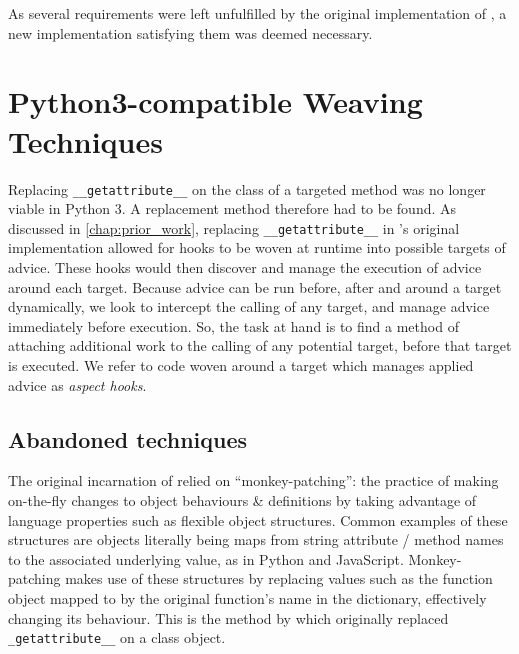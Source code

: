 As several requirements were left unfulfilled by the original
implementation of \pdsf{}, a new implementation satisfying them was deemed
necessary.


\section{Python3-compatible Weaving Techniques}\label{sec:pdsf3python3}

Replacing \lstinline{__getattribute__} on the class of a targeted method was no
longer viable in Python 3. A replacement method therefore had to be found. As
discussed in \cref{chap:prior_work}, replacing \lstinline{__getattribute__} in
\pdsf{}'s original implementation allowed for hooks to be woven
at runtime into possible targets of advice. These hooks would then
discover and manage the execution of advice around each target. Because advice
can be run before, after and around a target dynamically, we look to intercept the calling of
any target, and manage advice immediately before execution. So, the task at
hand is to find a method of attaching additional work to the calling of any
potential target, before that target is executed. We refer to code woven
around a target which manages applied advice as \emph{aspect hooks}.


\subsection{Abandoned techniques}\label{subsec:pdsf3badweaving}

The original incarnation of \pdsf{} relied on ``monkey-patching'': 
the practice of making on-the-fly changes to object
behaviours \& definitions by taking advantage of language properties such as
flexible object structures. Common examples of these structures are objects
literally being maps from string attribute / method names to the associated
underlying value, as in Python and JavaScript. Monkey-patching makes use of
these structures by replacing values such as the function object mapped to by
the original function's name in the dictionary, effectively changing its
behaviour. This is the method by which \pdsf{} originally replaced
\lstinline{_getattribute__} on a class object.

